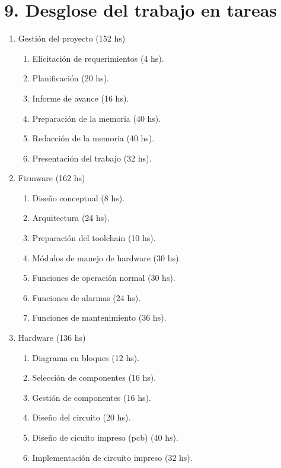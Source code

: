 \documentclass[
11pt, %
codirector, %
]{charter}
\begin{document}
\section{9. Desglose del trabajo en tareas}
\label{sec:wbs}


\begin{enumerate}
\item Gestión del proyecto (152 hs)
	\begin{enumerate}
	\item Elicitación de requerimientos (4 hs).
	\item Planificación (20 hs).
	\item Informe de avance (16 hs).
	\item Preparación de la memoria (40 hs).
	\item Redacción de la memoria (40 hs).
	\item Presentación del trabajo (32 hs).
	\end{enumerate}
\item Firmware (162 hs)
	\begin{enumerate}
	\item Diseño conceptual (8 hs).
	\item Arquitectura (24 hs).
	\item Preparación del toolchain (10 hs).
	\item Módulos de manejo de hardware (30 hs).
	\item Funciones de operación normal (30 hs).
	\item Funciones de alarmas (24 hs).
	\item Funciones de mantenimiento (36 hs).
	\end{enumerate}
\item Hardware (136 hs)
	\begin{enumerate}
	\item Diagrama en bloques (12 hs).
	\item Selección de componentes (16 hs).
	\item Gestión de componentes (16 hs).
	\item Diseño del circuito (20 hs).
	\item Diseño de cicuito impreso (pcb) (40 hs).
	\item Implementación de circuito impreso (32 hs).

\end{enumerate}
\end{enumerate}
\end{document}
